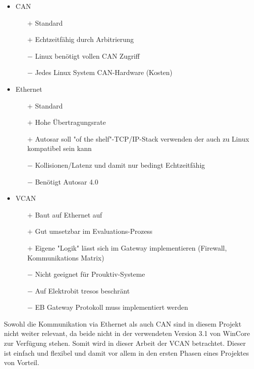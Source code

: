 \documentclass[
  a4paper,					    %
  twoside,
  DIV=calc,     				%
  bibliography=totoc,
  cleardoublepage=empty,
  ngerman,     					%
  final       					%
]{scrbook}
\begin{document}
\begin{itemize}
    \item CAN
    \begin{itemize}
        \item[$+$] Standard
        \item[$+$] Echtzeitfähig durch Arbitrierung
        \item[$-$] Linux benötigt vollen CAN Zugriff
        \item[$-$] Jedes Linux System CAN-Hardware (Kosten)
    \end{itemize}
    \item Ethernet
    \begin{itemize}
        \item[$+$] Standard
        \item[$+$] Hohe Übertragungsrate
        \item[$+$] Autosar soll "of the shelf"-TCP/IP-Stack verwenden der auch zu Linux kompatibel sein kann\cite[S. 21]{autosar_eth}
        \item[$-$] Kollisionen/Latenz und damit nur bedingt Echtzeitfähig
        \item[$-$] Benötigt Autosar 4.0
    \end{itemize}
    \item VCAN
    \begin{itemize}
        \item[$+$] Baut auf Ethernet auf
        \item[$+$] Gut umsetzbar im Evaluations-Prozess
        \item[$+$] Eigene "Logik" lässt sich im Gateway implementieren (Firewall, Kommunikations Matrix)
        \item[$-$] Nicht geeignet für Prouktiv-Systeme
        \item[$-$] Auf Elektrobit tresos beschränt
        \item[$-$] EB Gateway Protokoll muss implementiert werden
    \end{itemize}
\end{itemize}

Sowohl die Kommunikation via Ethernet als auch CAN sind in diesem Projekt nicht weiter relevant, da beide nicht in der verwendeten Version 3.1 von WinCore zur Verfügung stehen. Somit wird in dieser Arbeit der VCAN betrachtet. Dieser ist einfach und flexibel und damit vor allem in den ersten Phasen eines Projektes von Vorteil.
\end{document}
